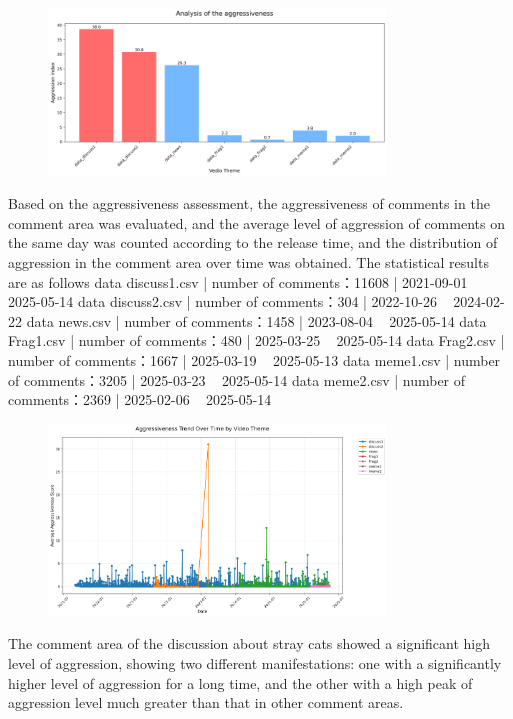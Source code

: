 \documentclass[12pt,a4paper]{ctexart}
\theoremstyle{MyLineTheoremStyle}
\theoremstyle{MyBlockTheoremStyle}
\theoremstyle{MySubsubsectionStyle}
\begin{document}
\begin{figure}[htbp]
    \centering
    \includegraphics[width=0.8\textwidth]{img/aggressive_analysis.png}
\end{figure}
\newpage

Based on the aggressiveness assessment, the aggressiveness of comments in the comment area was evaluated, and the average level of aggression of comments on the same day was counted according to the release time, and the distribution of aggression in the comment area over time was obtained.
The statistical results are as follows
data discuss1.csv | number of comments：11608 | 2021-09-01 ~ 2025-05-14
data discuss2.csv | number of comments：304 | 2022-10-26 ~ 2024-02-22
data news.csv | number of comments：1458 | 2023-08-04 ~ 2025-05-14
data Frag1.csv | number of comments：480 | 2025-03-25 ~ 2025-05-14
data Frag2.csv | number of comments：1667 | 2025-03-19 ~ 2025-05-13
data meme1.csv | number of comments：3205 | 2025-03-23 ~ 2025-05-14
data meme2.csv | number of comments：2369 | 2025-02-06 ~ 2025-05-14

\begin{figure}[htbp]
    \centering
    \includegraphics[width=0.8\textwidth]{img/aggressive_trend.png}
\end{figure}
\newpage

The comment area of the discussion about stray cats showed a significant high level of aggression, showing two different manifestations: one with a significantly higher level of aggression for a long time, and the other with a high peak of aggression level much greater than that in other comment areas.
\end{document}
